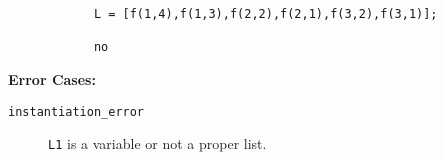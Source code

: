 \begin{description}
{\begin{verbatim}
            L = [f(1,4),f(1,3),f(2,2),f(2,1),f(3,2),f(3,1)];

            no \end{verbatim}}

{\bf Error Cases:}
\begin{description} 
\item[{\tt instantiation\_error}]
     {\tt L1} is a variable or not a proper list.  
\end{description}
\end{description}

